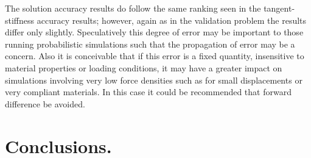 \documentclass[preprint,12pt]{elsarticle}
\begin{document}
The solution accuracy results do follow the same ranking seen in the tangent-stiffness accuracy results; however, again as in the validation problem the results differ only slightly. Speculatively this degree of error may be important to those running probabilistic simulations such that the propagation of error may be a concern. Also it is conceivable that if this error is a fixed quantity, insensitive to material properties or loading conditions, it may have a greater impact on simulations involving very low force densities such as for small displacements or very compliant materials. In this case it could be recommended that forward difference be avoided. 
%
\section{Conclusions.}
\label{sec:Conc}
%
%
\end{document}
